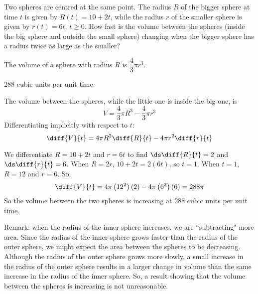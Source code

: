 \begin{question}
Two spheres are centred at the same point. The radius $R$ of the bigger sphere at time $t$ is given by $R(t)=10+2t$, while the radius $r$ of the smaller sphere is given by $r(t)=6t$, $t \ge 0$. How fast is the volume between the spheres (inside the big sphere and outside the small sphere) changing when the bigger sphere has a radius twice as large as the smaller?
\end{question}
\begin{hint}
The volume of a sphere with radius $R$ is $\dfrac{4}{3}\pi r^3$.
\end{hint}
\begin{answer}
$288$ cubic units per unit time
\end{answer}
\begin{solution}
The volume between the spheres, while the little one is inside the big one, is
\[V=\frac{4}{3}\pi R^3 - \frac{4}{3}\pi r^3\]
Differentiating implicitly with respect to $t$:
\[\diff{V}{t}=4\pi R^2\diff{R}{t}-4\pi r^2\diff{r}{t}\]

We differentiate $R=10+2t$ and $r=6t$ to find $\ds\diff{R}{t}=2$ and $\ds\diff{r}{t}=6$. When $R=2r$, $10+2t=2(6t)$, so $t=1$. When $t=1$, $R=12$ and $r=6$. So:
\[\diff{V}{t}=4\pi\left(12^2\right)(2)-4\pi\left(6^2\right)(6)=288\pi\]
So the volume between the two spheres is increasing at 288 cubic units per unit time.

Remark: when the radius of the inner sphere increases, we are ``subtracting" more area. Since the radius of the inner sphere grows faster than the radius of the outer sphere, we might expect the area between the spheres to be decreasing. Although the radius of the outer sphere grows more slowly, a small increase in the radius of the outer sphere results in a larger change in volume than the same increase in the radius of the inner sphere. So, a result showing that the volume between the spheres is increasing is not unreasonable.
\end{solution}



